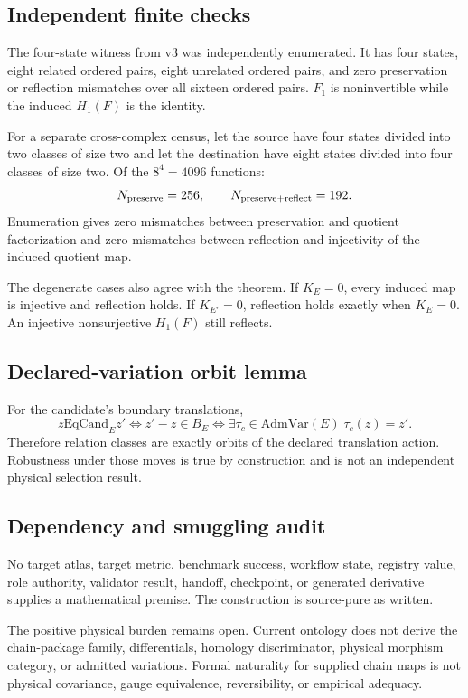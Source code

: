\subsection{Independent finite checks}

The four-state witness from v3 was independently enumerated. It has four
states, eight related ordered pairs, eight unrelated ordered pairs, and zero
preservation or reflection mismatches over all sixteen ordered pairs.
\(F_1\) is noninvertible while the induced \(H_1(F)\) is the identity.

For a separate cross-complex census, let the source have four states divided
into two classes of size two and let the destination have eight states divided
into four classes of size two. Of the \(8^4=4096\) functions:
\[
  N_{\rm preserve}=256,\qquad
  N_{\rm preserve+reflect}=192.
\]
Enumeration gives zero mismatches between preservation and quotient
factorization and zero mismatches between reflection and injectivity of the
induced quotient map.

The degenerate cases also agree with the theorem. If \(K_E=0\), every induced
map is injective and reflection holds. If \(K_{E'}=0\), reflection holds
exactly when \(K_E=0\). An injective nonsurjective \(H_1(F)\) still reflects.

\subsection{Declared-variation orbit lemma}

For the candidate's boundary translations,
\[
 z\mathrel{\mathrm{EqCand}_E}z'
 \iff z'-z\in B_E
 \iff \exists \tau_c\in\mathrm{AdmVar}(E)\; \tau_c(z)=z'.
\]
Therefore relation classes are exactly orbits of the declared translation
action. Robustness under those moves is true by construction and is not an
independent physical selection result.

\subsection{Dependency and smuggling audit}

No target atlas, target metric, benchmark success, workflow state, registry
value, role authority, validator result, handoff, checkpoint, or generated
derivative supplies a mathematical premise. The construction is source-pure
as written.

The positive physical burden remains open. Current ontology does not derive
the chain-package family, differentials, homology discriminator, physical
morphism category, or admitted variations. Formal naturality for supplied
chain maps is not physical covariance, gauge equivalence, reversibility, or
empirical adequacy.

